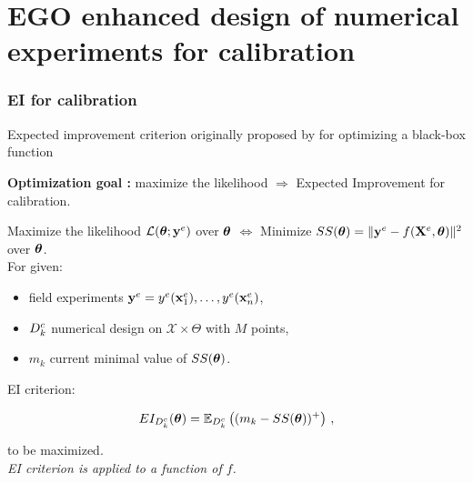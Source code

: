 \documentclass[nopagenumber,9pt]{beamer}
\begin{document}
\section{EGO enhanced design of numerical experiments for calibration}





\begin{frame}
 \frametitle{EI for calibration}
 
  Expected improvement criterion originally  proposed by \cite{jones1998efficient} for optimizing a black-box function
 
 \bigskip
 
 \textbf{Optimization goal :} maximize the likelihood $\Rightarrow$ Expected Improvement for calibration.\\
 
\bigskip
 
  Maximize the likelihood $\mathcal{L}(\boldsymbol{\theta};\mathbf{y}^{e}  )$ over $\boldsymbol{\theta}$ $\Leftrightarrow$
  Minimize $SS(\boldsymbol{\theta})=\Vert \mathbf{y}^{e} - f(\mathbf{X}^e,\boldsymbol{\theta}) \Vert^2$ over $\boldsymbol{\theta}$.
 \\
 
 \bigskip
 For given:
 
 \begin{itemize}
  \item field experiments $\mathbf{y}^{e}=y^{e}(\mathbf{x}^e_1),\ldots,y^{e}(\mathbf{x}^e_n)$,
  \item $D^c_k$ numerical design on $\mathcal{X}\times \Theta$ with $M$ points,
  \item $m_k$ current minimal value of $SS(\boldsymbol{\theta})$. 
 \end{itemize}

  \bigskip
  
  EI criterion:
  
  $$EI_{D^c_k}(\boldsymbol{\theta})=\mathbb{E}_{D^c_k}\left((m_k-SS(\boldsymbol{\theta}))^+ \right) \,,$$
 
 to be maximized.\\
 
 \medskip
 \textit{EI criterion is applied to a function of $f$.}
 
\end{frame}
\end{document}
